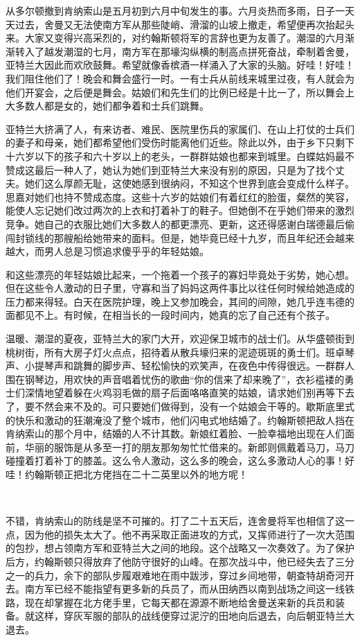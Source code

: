 \par 从多尔顿撤到肯纳索山是五月初到六月中旬发生的事。六月炎热而多雨，日子一天天过去，舍曼又无法使南方军从那些陡峭、滑溜的山坡上撤走，希望便再次抬起头来。大家又变得兴高采烈的，对约翰斯顿将军的言辞也更为友善了。潮湿的六月渐渐转入了越发潮湿的七月，南方军在那壕沟纵横的制高点拼死奋战，牵制着舍曼，亚特兰大因此而欢欣鼓舞。希望就像香槟酒一样涌入了大家的头脑。好哇！好哇！我们阻住他们了！晚会和舞会盛行一时。一有士兵从前线来城里过夜，有人就会为他们开宴会，之后便是舞会。姑娘们和先生们的比例已经是十比一了，所以舞会上大多数人都是女的，她们都争着和士兵们跳舞。
\par 亚特兰大挤满了人，有来访者、难民、医院里伤兵的家属们、在山上打仗的士兵们的妻子和母亲，她们都希望他们受伤时能离他们近些。除此以外，由于乡下只剩下十六岁以下的孩子和六十岁以上的老头，一群群姑娘也都来到城里。白蝶姑妈最不赞成这最后一种人了，她认为她们到亚特兰大来没有别的原因，只是为了找个丈夫。她们这么厚颜无耻，这使她感到很纳闷，不知这个世界到底会变成什么样子。思嘉对她们也持不赞成态度。这些十六岁的姑娘们有着红红的脸蛋，粲然的笑容，能使人忘记她们改过两次的上衣和打着补丁的鞋子。但她倒不在乎她们带来的激烈竞争。她自己的衣服比她们大多数人的都更漂亮、更新，这还得感谢白瑞德最后偷闯封锁线的那艘船给她带来的面料。但是，她毕竟已经十九岁，而且年纪还会越来越大，而男人总是习惯追求傻乎乎的年轻姑娘。
\par 和这些漂亮的年轻姑娘比起来，一个拖着一个孩子的寡妇毕竟处于劣势，她心想。但在这些令人激动的日子里，守寡和当了妈妈这两件事比以往任何时候给她造成的压力都来得轻。白天在医院护理，晚上又参加晚会，其间的间隙，她几乎连韦德的面都见不上。有时候，在相当长的一段时间内，她真的忘了自己还有个孩子。
\par 温暖、潮湿的夏夜，亚特兰大的家门大开，欢迎保卫城市的战士们。从华盛顿街到桃树街，所有大房子灯火点点，招待着从散兵壕归来的泥迹斑斑的勇士们。班卓琴声、小提琴声和跳舞的脚步声、轻松愉快的欢笑声，在夜色中传得很远。一群群人围在钢琴边，用欢快的声音唱着忧伤的歌曲“你的信来了却来晚了”，衣衫褴褛的勇士们深情地望着躲在火鸡羽毛做的扇子后面咯咯直笑的姑娘，请求她们别再等下去了，要不然会来不及的。可只要她们做得到，没有一个姑娘会干等的。歇斯底里式的快乐和激动的狂潮淹没了整个城市，他们闪电式地结婚了。约翰斯顿把敌人挡在肯纳索山的那个月中，结婚的人不计其数。新娘红着脸、一脸幸福地出现在人们面前，华丽的服饰是从多至一打的朋友那匆匆忙忙借来的。新郎则佩戴着马刀，马刀碰撞着打着补丁的膝盖。这么令人激动，这么多的晚会，这么多激动人心的事！好哇！约翰斯顿正把北方佬挡在二十二英里以外的地方呢！
\par  
\par 不错，肯纳索山的防线是坚不可摧的。打了二十五天后，连舍曼将军也相信了这一点，因为他的损失太大了。他不再采取正面进攻的方式，又挥师进行了一次大范围的包抄，想占领南方军和亚特兰大之间的地段。这个战略又一次奏效了。为了保护后方，约翰斯顿只得放弃了他防守很好的山峰。在那次战斗中，他已经失去了三分之一的兵力，余下的部队步履艰难地在雨中跋涉，穿过乡间地带，朝查特胡奇河开去。南方军已经不能指望有更多新的兵员了，而从田纳西以南到战场之间这一线铁路，现在却掌握在北方佬手里，它每天都在源源不断地给舍曼送来新的兵员和装备。就这样，穿灰军服的部队的战线便穿过泥泞的田地向后退去，向后朝亚特兰大退去。
